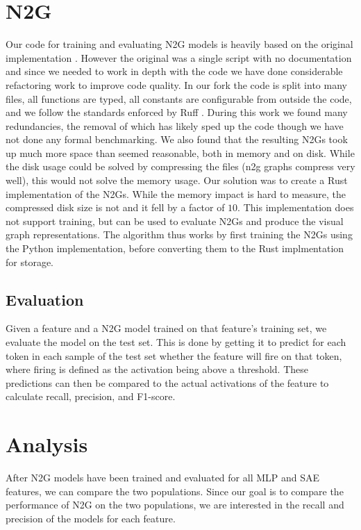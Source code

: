 \section{N2G}
Our code for training and evaluating N2G models is heavily based on the original implementation .
However the original was a single script with no documentation and since we needed to work in depth with the code we have done considerable refactoring work to improve code quality.
In our fork  the code is split into many files, all functions are typed, all constants are configurable from outside the code, and we follow the standards enforced by Ruff .
During this work we found many redundancies, the removal of which has likely sped up the code though we have not done any formal benchmarking.
We also found that the resulting N2Gs took up much more space than seemed reasonable, both in memory and on disk.
While the disk usage could be solved by compressing the files (n2g graphs compress very well), this would not solve the memory usage.
Our solution was to create a Rust implementation of the N2Gs.
While the memory impact is hard to measure, the compressed disk size is not and it fell by a factor of $10$.
This implementation does not support training, but can be used to evaluate N2Gs and produce the visual graph representations.
The algorithm thus works by first training the N2Gs using the Python implementation, before converting them to the Rust implmentation for storage.

\subsection{Evaluation}
Given a feature and a N2G model trained on that feature's training set, we evaluate the model on the test set.
This is done by getting it to predict for each token in each sample of the test set whether the feature will fire on that token, where firing is defined as the activation being above a threshold.
These predictions can then be compared to the actual activations of the feature to calculate recall, precision, and F1-score.

\section{Analysis}
After N2G models have been trained and evaluated for all MLP and SAE features, we can compare the two populations.
Since our goal is to compare the performance of N2G on the two populations, we are interested in the recall and precision of the models for each feature.





